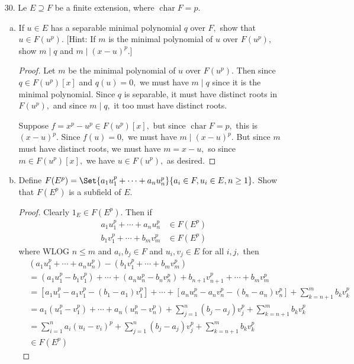 \documentclass{article}
\DeclareMathOperator{\cha}{char}
\begin{document}
\begin{itemize}
	\item[30.] Le $E\supseteq F$ be a finite extension, where $\cha F=p.$
		\begin{enumerate}[(a)]
			\item If $u\in E$ has a separable minimal polynomial $q$ over $F,$ show that $u\in F(u^p).$ [Hint: If $m$ is the minimal polynomial of $u$ over $F(u^p),$ show $m\mid q$ and $m\mid(x-u)^p.$]
				\begin{proof}
					Let $m$ be the minimal polynomial of $u$ over $F(u^p).$ Then since $q\in F(u^p)[x]$ and $q(u) = 0,$ we must have $m\mid q$ since it is the minimal polynomial. Since $q$ is separable, it must have distinct roots in $F(u^p),$ and since $m\mid q,$ it too must have distinct roots. 

					Suppose $f=x^p-u^p\in F(u^p)[x],$ but since $\cha F=p,$ this is $(x-u)^p.$ Since $f(u)=0,$ we must have $m\mid (x-u)^p.$ But since $m$ must have distinct roots, we must have $m=x-u,$ so since $m\in F(u^p)[x],$ we have $u\in F(u^p),$ as desired.
				\end{proof}

			\item Define $F(E^p)=\Set{a_1u_1^p + \cdots + a_nu_n^p}{a_i\in F, u_i\in E, n\ge 1}.$ Show that $F(E^p)$ is a subfield of $E.$
				\begin{proof}
					Clearly $1_E\in F(E^p).$ Then if
					\begin{align*}
						a_1u_1^p + \cdots + a_n u_n^p &\in F(E^p) \\
						b_1v_1^p + \cdots + b_m v_m^p &\in F(E^p)
					\end{align*}
					where WLOG $n\le m$ and $a_i, b_j\in F$ and $u_i, v_j\in E$ for all $i, j,$ then 
					\begin{align*}
						&(a_1u_1^p + \cdots + a_n u_n^p) - (b_1v_1^p + \cdots + b_m v_m^p) \\
						&= (a_1u_1^p - b_1v_1^p) + \cdots + (a_nu_n^p - b_n v_n^p) + b_{n+1}v_{n+1}^p + \cdots + b_m v_m^p \\
						&= [a_1u_1^p - a_1v_1^p - (b_1-a_1)v_1^p] + \cdots + [a_nu_n^p - a_nv_n^p - (b_n - a_n)v_n^p] + \sum_{k=n+1}^{m} b_k v_k^p \\
						&= a_1(u_1^p-v_1^p) + \cdots + a_n(u_n^p-v_n^p) + \sum_{j=1}^{n} (b_j-a_j) v_j^p + \sum_{k=n+1}^{m} b_k v_k^p \\
						&= \sum_{i=1}^{n} a_i(u_i-v_i)^p + \sum_{j=1}^{n} (b_j-a_j)v_j^p + \sum_{k=n+1}^{m} b_k v_k^p \\
						&\in F(E^p)
					\end{align*}
				\end{proof}
			

\end{enumerate}
\end{itemize}
\end{document}
